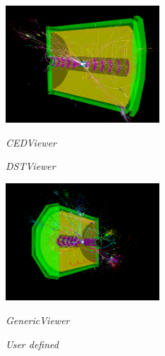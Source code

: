 \documentclass[a4paper,10pt]{article}
\begin{document}
\begin{figure}[h]
\begin{minipage}[t]{6cm}
\setlength{\fboxsep}{0mm}
\centerline{\includegraphics[height=4.4cm]{img/ced_viewer.png}}
\caption{\label{CEDViewer} \textsl{CEDViewer}}
\end{minipage}
\hfill
\begin{minipage}[t]{6cm}
\setlength{\fboxsep}{0mm}
\centerline{}
\caption{\label{DSTViewer}\textsl{DSTViewer}}
\end{minipage}
\end{figure}

\begin{figure}[h]
\begin{minipage}[t]{6cm}
\setlength{\fboxsep}{0mm}
\centerline{\includegraphics[height=4.4cm]{img/generic_viewer.png}}
\caption{\label{GenericViewer} \textsl{GenericViewer}}
\end{minipage}
\hfill
\begin{minipage}[t]{6cm}
\setlength{\fboxsep}{0mm}
\centerline{}
\caption{\label{User viewer}\textsl{User defined}}
\end{minipage}
\end{figure}
\end{document}

